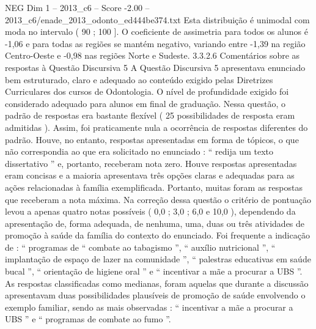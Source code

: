 \begin{textsample}{NEG Dim 1 – 2013\_c6 – Score -2.00 – 2013\_c6/enade\_2013\_odonto\_ed444be374.txt}
Esta distribuição é unimodal com moda no intervalo ( 90 ; 100 ].
O coeficiente de assimetria para todos os alunos é -1,06 e para todas as regiões se mantém negativo, variando entre -1,39 na região Centro-Oeste e -0,98 nas regiões Norte e Sudeste. 3.3.2.6 Comentários sobre as respostas à Questão Discursiva 5 A Questão Discursiva 5 apresentava enunciado bem estruturado, claro e adequado ao conteúdo exigido pelas Diretrizes Curriculares dos cursos de Odontologia.
O nível de profundidade exigido foi considerado adequado para alunos em final de graduação.
Nessa questão, o padrão de respostas era bastante flexível ( 25 possibilidades de resposta eram admitidas ).
Assim, foi praticamente nula a ocorrência de respostas diferentes do padrão.
Houve, no entanto, respostas apresentadas em forma de tópicos, o que não correspondia ao que era solicitado no enunciado : “ redija um texto dissertativo ” e, portanto, receberam nota zero.
Houve respostas apresentadas eram concisas e a maioria apresentava três opções claras e adequadas para as ações relacionadas à família exemplificada.
Portanto, muitas foram as respostas que receberam a nota máxima.
Na correção dessa questão o critério de pontuação levou a apenas quatro notas possíveis ( 0,0 ; 3,0 ; 6,0 e 10,0 ), dependendo da apresentação de, forma adequada, de nenhuma, uma, duas ou três atividades de promoção à saúde da família do contexto do enunciado.
Foi frequente a indicação de : “ programas de “ combate ao tabagismo ”, “ auxílio nutricional ”, “ implantação de espaço de lazer na comunidade ”, “ palestras educativas em saúde bucal ”, “ orientação de higiene oral ” e “ incentivar a mãe a procurar a UBS ”.
As respostas classificadas como medianas, foram aquelas que durante a discussão apresentavam duas possibilidades plausíveis de promoção de saúde envolvendo o exemplo familiar, sendo as mais observadas : “ incentivar a mãe a procurar a UBS ” e “ programas de combate ao fumo ”.

\end{textsample}
